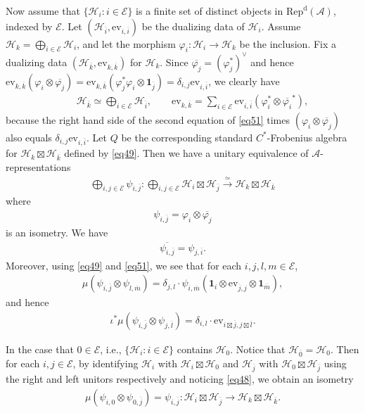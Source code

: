 \documentclass[12pt,a4paper]{article}
\theoremstyle{definition}
\theoremstyle{plain}
\newcommand{\mc}{\mathcal}
\newcommand{\ovl}{\overline}
\newcommand{\id}{\mathbf{1}}
\newcommand{\ev}{\mathrm{ev}}
\newcommand{\RepdA}{\mathrm{Rep}^{\mathrm d}(\mc A)}
\numberwithin{equation}{section}
\begin{document}
Now assume that $\{\mc H_i:i\in\mc E\}$ is a finite set of distinct objects in $\RepdA$, indexed by $\mc E$. Let $(\mc H_{\ovl i},\ev_{i,\ovl i})$ be the dualizing data of $\mc H_i$. Assume $\mc H_k=\bigoplus_{i\in\mc E}\mc H_i$, and let the morphism $\varphi_i:\mc H_i\rightarrow\mc H_k$ be the inclusion. Fix a dualizing data $(\mc H_{\ovl k},\ev_{k,\ovl k})$ for $\mc H_k$. Since $\ovl{\varphi_j}=(\varphi_j^*)^\vee$ and hence $\ev_{k,\ovl k}(\varphi_i\otimes\ovl{\varphi_j})=\ev_{k,\ovl k}(\varphi_j^*\varphi_i\otimes\id_{\ovl j})=\delta_{i,j}\ev_{i,\ovl i}$, we clearly have
\begin{gather}
	\qquad \mc H_{\ovl k}\simeq\bigoplus_{i\in\mc E}\mc H_{\ovl i},\qquad \ev_{k,\ovl k}=\sum_{i\in\mc E}\ev_{i,\ovl i}(\varphi_i^*\otimes\ovl{\varphi_i}^*),\label{eq51}
\end{gather}
because the right hand side of the second equation of \eqref{eq51} times $(\varphi_i\otimes\ovl{\varphi_j})$ also equals $\delta_{i,j}\ev_{i,\ovl i}$. Let $Q$ be the corresponding standard $C^*$-Frobenius algebra for $\mc H_k\boxtimes\mc H_{\ovl k}$ defined by \eqref{eq49}. Then we have a unitary equivalence of $\mc A$-representations
\begin{align}
\bigoplus_{i,j\in\mc E}\psi_{i,\ovl j}:\bigoplus_{i,j\in\mc E}\mc H_i\boxtimes\mc H_{\ovl j}\xrightarrow{\simeq}	\mc H_k\boxtimes\mc H_{\ovl k}\label{eq19}
\end{align}
where
\begin{align}
\psi_{i,\ovl j}=\varphi_i\otimes\ovl{\varphi_j}\label{eq64}
\end{align}
is an isometry. We have
\begin{align}
	\ovl{\psi_{i,\ovl j}}=\psi_{j,\ovl i}.\label{eq65}
\end{align}
Moreover, using \eqref{eq49} and \eqref{eq51}, we see that for each $i,j,l,m\in\mc E$, 
\begin{align}
	\mu(\psi_{i,\ovl j}\otimes\psi_{l,\ovl m})=\delta_{j,l}\cdot \psi_{i,\ovl m}(\id_i\otimes\ev_{\ovl j,j}\otimes\id_{\ovl m}),\label{eq48}
\end{align}
and hence
\begin{align}
\iota^*\mu(\psi_{i,\ovl j}\otimes\psi_{j,\ovl l})=\delta_{i,l}\cdot \ev_{i\boxtimes\ovl j, j\boxtimes\ovl l}.\label{eq70}
\end{align}



In the case that $0\in\mc E$, i.e., $\{\mc H_i:i\in\mc E\}$ contains $\mc H_0$. Notice that $\mc H_{\ovl 0}=\mc H_0$. Then for each $i,j\in\mc E$, by identifying $\mc H_i$ with $\mc H_i\boxtimes\mc H_0$ and $\mc H_{\ovl j}$ with $\mc H_0\boxtimes\mc H_{\ovl j}$ using the right and left unitors respectively and noticing \eqref{eq48}, we obtain an isometry
\begin{gather}
\mu(\psi_{i,0}\otimes\psi_{0,\ovl j})=\psi_{i,\ovl j}:\mc H_i\boxtimes\mc H_{\ovl j}\rightarrow \mc H_k\boxtimes\mc H_{\ovl k}.	\label{eq66}
\end{gather}
\end{document}
